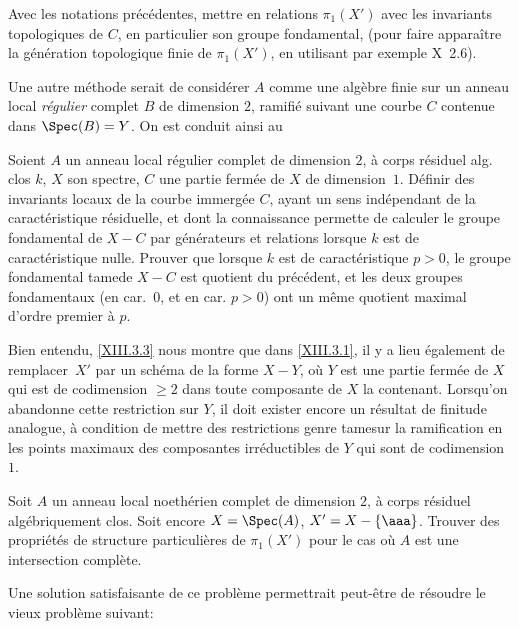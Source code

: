 \begin{probleme} \label{XIII.3.2}
Avec les notations pr\'ec\'edentes, mettre en relations $\pi_1(X')$ avec les invariants topologiques de $C$, en particulier son groupe fondamental, (pour faire appara\^itre la g\'en\'eration topologique finie de $\pi_1(X')$, en utilisant par exemple \SGA \textup{X~2.6}).
\end{probleme}

Une autre m\'ethode serait de consid\'erer $A$ comme une alg\`ebre finie sur un anneau local \emph{régulier} complet $B$ de dimension $2$, ramifi\'e suivant une courbe $C$ contenue dans $\Spec(B)=Y$. On est conduit ainsi au

\begin{probleme} \label{XIII.3.3}
Soient $A$ un anneau local r\'egulier complet de dimension $2$, \`a corps r\'esiduel alg. clos $k$, $X$ son spectre, $C$ une partie ferm\'ee de $X$ de dimension~$1$. D\'efinir des invariants locaux de la courbe immerg\'ee $C$, ayant un sens ind\'ependant de la caract\'eristique r\'esiduelle, et dont la connaissance permette de calculer le groupe fondamental de $X-C$ par g\'en\'erateurs et relations lorsque $k$ est de caract\'eristique nulle. Prouver que lorsque $k$ est de caract\'eristique $p> 0$, le groupe fondamental \og tame\fg de $X-C$ est quotient du pr\'ec\'edent, et les deux groupes fondamentaux (en car.~$0$, et en car. $p> 0$) ont un m\^eme quotient maximal d'ordre premier \`a $p$.
\end{probleme}

Bien entendu, \ref{XIII.3.3} nous montre que dans \ref{XIII.3.1}, il y a lieu \'egalement de remplacer~$X'$ par un sch\'ema de la forme $X-Y$, o\`u $Y$ est une partie ferm\'ee de $X$ qui est de codimension $\ge 2$ dans toute composante de $X$ la contenant. Lorsqu'on abandonne cette restriction sur $Y$, il doit exister encore un r\'esultat de finitude analogue, \`a condition de mettre des restrictions genre \og tame\fg sur la ramification en les points maximaux des composantes irr\'eductibles de $Y$ qui sont de codimension $1$.

\begin{probleme} \label{XIII.3.4}
Soit $A$ un anneau local noeth\'erien complet de dimension $2$, \`a corps r\'esiduel alg\'ebriquement clos. Soit encore $X=\Spec(A)$, $X'=X-\{\aaa\}$. Trouver des propri\'et\'es de structure particuli\`eres de $\pi_1(X')$ pour le cas o\`u $A$ est une intersection compl\`ete.
\end{probleme}

Une solution satisfaisante de ce probl\`eme permettrait peut-\^etre de r\'esoudre le vieux probl\`eme suivant:

